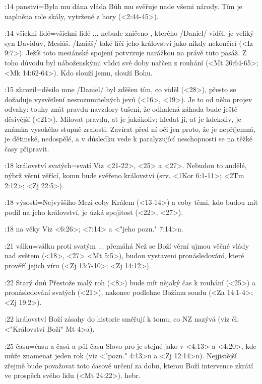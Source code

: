 :14 {panství}={Byla mu dána vláda} Bůh mu svěřuje  nade všemi národy. Tím je naplněna role skály, vytržené z hory (<2:44-45>).

:14 {všickni lidé}={všichni lidé ... nebude zničeno} , kterého \x/Daniel/ viděl, je veliký syn Davidův, Mesiáš. \x/Izaiáš/ také líčí jeho království jako nikdy nekončící  (<Iz 9:7>). Ježíš toto mesiánské spojení potvrzuje narážkou na právě tuto pasáž. Z toho důvodu byl náboženskými vůdci své doby nařčen z rouhání (<Mt 26:64-65>; <Mk 14:62-64>). Kdo slouží jemu, slouží Bohu.

:15 {zhrozil}={děsilo mne} \x/Daniel/ byl zděšen tím, co viděl (<28>), přesto se dožaduje vysvětlení nesrozumitelných jevů (<16>, <19>). Je to od něho projev odvahy: touhy znát pravdu navzdory tušení, že odhalená záhada bude ještě děsivější (<21>). Milovat pravdu, ať je jakákoliv; hledat ji, ať je kdekoliv, je známka vysokého stupně zralosti. Zavírat před ní oči jen proto, že je nepříjemná, je dětinské, nedospělé, a v důsledku vede k paralyzující neschopnosti se na těžké časy připravit. 

:18 {království svatých}={svatí}  Viz <21-22>, <25> a <27>. Nebudou to andělé, nýbrž věrní věřící, komu bude svěřeno království (srv. <1Kor 6:1-11>; <2Tm 2:12>; <Zj 22:5>). 

:18 {výsostí}={Nejvyššího} Mezi  coby Králem (<13-14>) a  coby těmi, kdo budou mít podíl na jeho království, je úzká spojitost (<22>, <27>).

:18 {na věky}  Viz <6:26>;  <7:14> a <"jeho pozn." 7:14>n.

:21 {válku}={válku proti svatým ... přemáhá} Než se Boží věrní ujmou věčné vlády nad světem  (<18>, <27> <Mt 5:5>), budou vystaveni pronásledování, které prověří jejich víru  (<Zj 13:7-10>; <Zj 14:12>).

:22 {Starý dnů} Přestože malý roh  (<8>) bude mít nějaký čas k rouhání (<25>) a pronásledování svatých (<21>), nakonec podlehne Božímu soudu (<Za 14:1-4>; <Zj 19:2>).

:22 {království} Boží zásahy do historie směřují k tomu, co NZ nazývá   (viz čl. <"Království Boží" Mt 4>a).

:25 {času}={času a časů a půl času} Slovo pro  je stejné jako v <4:13> a <4:20>, kde může znamenat jeden rok (viz <"pozn." 4:13>n a <Zj 12:14>n). Nejjistější zřejmě bude považovat toto časové určení za dobu, kterou  Boží intervence zkrátí ve prospěch svého lidu (<Mt 24:22>).
\dopsat hebr.

